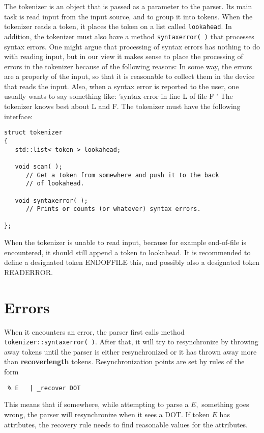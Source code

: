 \documentclass{article}
\begin{document}
\noindent
The tokenizer is an object that is passed as a parameter to the parser.
Its main task is read input from the input source, and to group it
into tokens. When the tokenizer reads a token, it places the token
on a list called \verb+lookahead+. 
In addition, the tokenizer must also have a method
\verb+syntaxerror( )+ that processes syntax errors.
One might argue that processing of syntax errors has nothing to
do with reading input, but in our view it makes sense to place
the processing of errors in the tokenizer because of the 
following reasons:
In some way, the errors are a property of the input, so that it is
reasonable to collect them in the device that reads the input. 
Also, when a syntax error
is reported to the user, one usually wants to say something like:
'syntax error in line L of file F ' 
The tokenizer knows best about L and F. The tokenizer
must have the following interface: 

\begin{verbatim}
struct tokenizer
{
   std::list< token > lookahead;
   
   void scan( );
      // Get a token from somewhere and push it to the back
      // of lookahead. 

   void syntaxerror( );
      // Prints or counts (or whatever) syntax errors.

};
\end{verbatim}

\noindent
When the tokenizer is unable to read input, because for example 
end-of-file is encountered, it should still append a token to
lookahead. It is recommended to define a designated token 
ENDOFFILE this, and possibly also a 
designated token READERROR.

\section{Errors}
 
\noindent
When it encounters an error, the parser first calls method 
\verb+tokenizer::syntaxerror( )+.
After that, it will try to resynchronize by throwing away tokens until
the parser is either resynchronized or it has thrown away 
more than {\bf recoverlength} tokens.
Resynchronization points are set by rules of the form
\begin{verbatim}
 % E   | _recover DOT 
\end{verbatim}
This means that if somewhere, while attempting to parse a $ E, $ 
something goes wrong, the 
parser will resynchronize when it sees a DOT.
If token $ E $ has attributes, the recovery rule needs to 
find reasonable values for the attributes.
\end{document}
